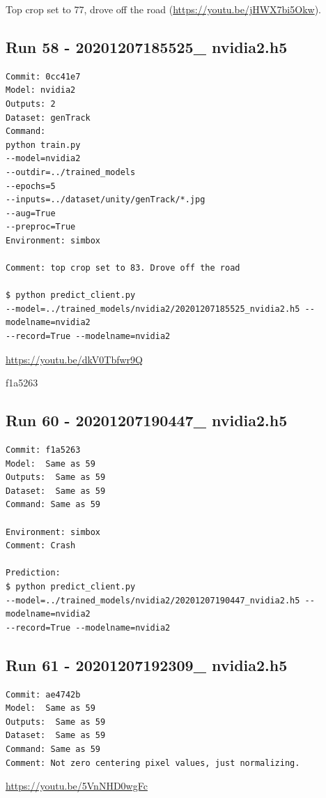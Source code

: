 Top crop set to 77, drove off the road (\url{https://youtu.be/jHWX7bi5Okw}).


\subsection{Run 58 - 20201207185525\_ nvidia2.h5}
\begin{verbatim}
Commit: 0cc41e7
Model: nvidia2
Outputs: 2
Dataset: genTrack   
Command:
python train.py 
--model=nvidia2
--outdir=../trained_models
--epochs=5
--inputs=../dataset/unity/genTrack/*.jpg
--aug=True
--preproc=True
Environment: simbox

Comment: top crop set to 83. Drove off the road

$ python predict_client.py 
--model=../trained_models/nvidia2/20201207185525_nvidia2.h5 --modelname=nvidia2 
--record=True --modelname=nvidia2

\end{verbatim}
\url{https://youtu.be/dkV0Tbfwr9Q}


f1a5263

\subsection{Run 60 - 20201207190447\_ nvidia2.h5}
\begin{verbatim}
Commit: f1a5263
Model:  Same as 59
Outputs:  Same as 59
Dataset:  Same as 59
Command: Same as 59

Environment: simbox
Comment: Crash

Prediction:
$ python predict_client.py 
--model=../trained_models/nvidia2/20201207190447_nvidia2.h5 --modelname=nvidia2 
--record=True --modelname=nvidia2
\end{verbatim}

\subsection{Run 61 - 20201207192309\_ nvidia2.h5 }
\begin{verbatim}
Commit: ae4742b
Model:  Same as 59
Outputs:  Same as 59
Dataset:  Same as 59
Command: Same as 59
Comment: Not zero centering pixel values, just normalizing.
\end{verbatim}
\url{https://youtu.be/5VnNHD0wgFc}


